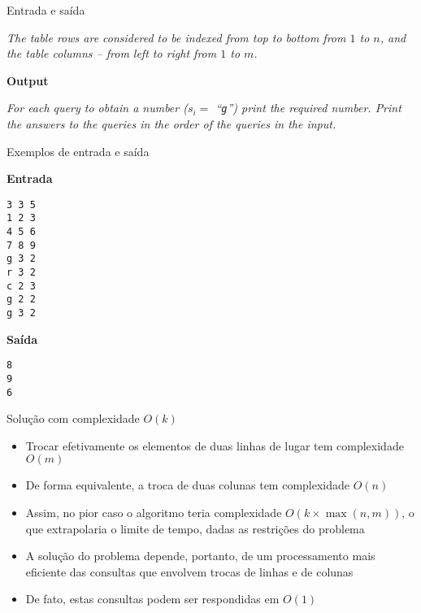 \begin{frame}[fragile]{Entrada e saída}

{\it The table rows are considered to be indexed from top to bottom from $1$ to $n$, and the table columns -- from left to right from $1$ to $m$.}

\vspace{0.2in}

\textbf{Output}

{\it
For each query to obtain a number ($s_i =$ ``\texttt{g}'') print the required number. Print the answers to the queries in the order of the queries in the input.
}

\end{frame}

\begin{frame}[fragile]{Exemplos de entrada e saída}

\begin{minipage}[t]{0.45\textwidth}
\textbf{Entrada}
\begin{verbatim}
3 3 5
1 2 3
4 5 6
7 8 9
g 3 2
r 3 2
c 2 3
g 2 2
g 3 2
\end{verbatim}
\end{minipage}
\begin{minipage}[t]{0.5\textwidth}
\textbf{Saída}
\begin{verbatim}
8
9
6
\end{verbatim}
\end{minipage}

\end{frame}


\begin{frame}[fragile]{Solução com complexidade $O(k)$}

    \begin{itemize}
        \item Trocar efetivamente os elementos de duas linhas de lugar tem complexidade $O(m)$

        \item De forma equivalente, a troca de duas colunas tem complexidade $O(n)$

        \item Assim, no pior caso o algoritmo teria complexidade $O(k\times \max(n, m))$, o que 
            extrapolaria o limite de tempo, dadas as restrições do problema

        \item A solução do problema depende, portanto, de um processamento mais eficiente das
            consultas que envolvem trocas de linhas e de colunas

        \item De fato, estas consultas podem ser respondidas em $O(1)$
    \end{itemize}

\end{frame}

